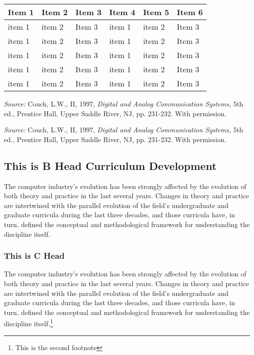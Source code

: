 \begin{table}
\begin{tabular}{@{}lll lll@{}}
Item 1 & Item 2 & Item 3 & Item 4 & Item 5 & Item 6 \\
\toprule
item 1 & item 2 & Item 3 & item 1 & item 2 & Item 3\\
item 1 & item 2 & Item 3 & item 1 & item 2 & Item 3\\
item 1 & item 2 & Item 3 & item 1 & item 2 & Item 3\\
item 1 & item 2 & Item 3 & item 1 & item 2 & Item 3\\
item 1 & item 2 & Item 3 & item 1 & item 2 & Item 3\\
\end{tabular}
\begin{tablefooter}
\hangindent=3pt \raggedright
{\it Source:} Couch, L.W.,
II, 1997, {\it Digital and Analog Communication Systems,}
5th ed., Prentice
Hall, Upper Saddle River, NJ, pp. 231-232.  With permission.

\hangindent=3pt \raggedright
{\it Source:} Couch, L.W.,
II, 1997, {\it Digital and Analog Communication Systems,}
5th ed., Prentice
Hall, Upper Saddle River, NJ, pp. 231-232.  With permission.
\end{tablefooter}
\end{table}


\subsection{This is B Head Curriculum Development}
\noindent
The computer industry's evolution has been strongly affected by
the evolution of both theory and practice in the last several
years. Changes in theory and practice are intertwined with the
parallel evolution of the field's undergraduate and graduate
curricula during the last three decades, and those curricula
have, in turn, defined the conceptual and methodological
framework for understanding the discipline itself.

\subsubsection{This is C Head}
The computer industry's evolution has been strongly affected by
the evolution of both theory and practice in the last several
years. Changes in theory and practice are intertwined with the
parallel evolution of the field's undergraduate and graduate
curricula during the last three decades, and those curricula
have, in turn, defined the conceptual and methodological
framework for understanding the discipline itself.\footnote{This is the second footnote}

